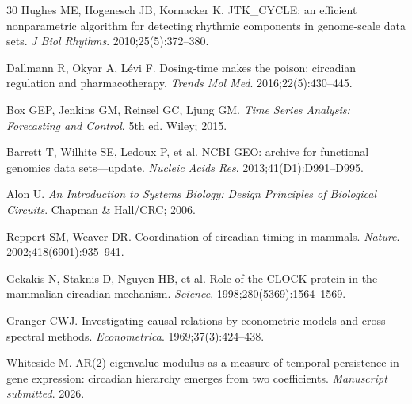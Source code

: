 \documentclass[11pt,letterpaper]{article}
\begin{document}
\begin{thebibliography}{30}
Hughes ME, Hogenesch JB, Kornacker K.
JTK\_CYCLE: an efficient nonparametric algorithm for detecting rhythmic components in genome-scale data sets.
\textit{J Biol Rhythms}. 2010;25(5):372--380.

Dallmann R, Okyar A, L{\'e}vi F.
Dosing-time makes the poison: circadian regulation and pharmacotherapy.
\textit{Trends Mol Med}. 2016;22(5):430--445.

Box GEP, Jenkins GM, Reinsel GC, Ljung GM.
\textit{Time Series Analysis: Forecasting and Control}. 5th ed. Wiley; 2015.

Barrett T, Wilhite SE, Ledoux P, et al.
NCBI GEO: archive for functional genomics data sets---update.
\textit{Nucleic Acids Res}. 2013;41(D1):D991--D995.

Alon U.
\textit{An Introduction to Systems Biology: Design Principles of Biological Circuits}.
Chapman \& Hall/CRC; 2006.

Reppert SM, Weaver DR.
Coordination of circadian timing in mammals.
\textit{Nature}. 2002;418(6901):935--941.

Gekakis N, Staknis D, Nguyen HB, et al.
Role of the CLOCK protein in the mammalian circadian mechanism.
\textit{Science}. 1998;280(5369):1564--1569.

Granger CWJ.
Investigating causal relations by econometric models and cross-spectral methods.
\textit{Econometrica}. 1969;37(3):424--438.

Whiteside M.
AR(2) eigenvalue modulus as a measure of temporal persistence in gene expression: circadian hierarchy emerges from two coefficients.
\textit{Manuscript submitted}. 2026.

\end{thebibliography}
\end{document}
